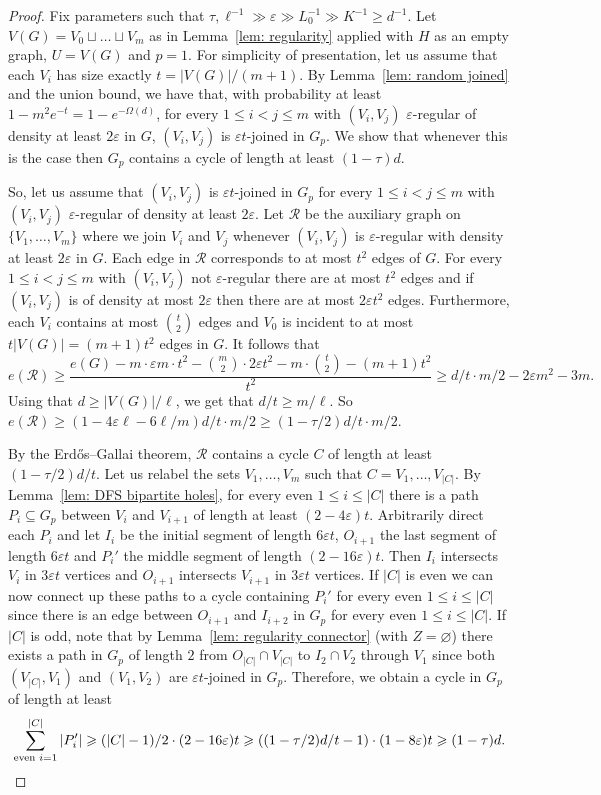 \documentclass[10pt]{article}
\theoremstyle{definition}
\let\leq\leqslant
\let\geq\geqslant
\begin{document}
\begin{proof}
Fix parameters such that $\tau, \ell^{-1}\gg \varepsilon\gg L_0^{-1}\gg K^{-1}\geq d^{-1}$.
Let $V(G)=V_0\sqcup\ldots\sqcup V_{m}$ as in Lemma~\ref{lem: regularity} applied with $H$ as an empty graph, $U=V(G)$ and $p=1$. For simplicity of presentation, let us assume that each $V_i$ has size exactly $t=|V(G)|/(m+1)$. By Lemma~\ref{lem: random joined} and the union bound, we have that, with probability at least $1-m^2e^{-t}=1-e^{-\Omega(d)}$, for every $1\leq i<j\leq m$ with $(V_i,V_j)$ $\varepsilon$-regular of density at least $2\varepsilon$ in $G$, $(V_i,V_j)$ is $\varepsilon t$-joined in $G_p$. We show that whenever this is the case then $G_p$ contains a cycle of length at least $(1-\tau)d$.

So, let us assume that $(V_i,V_j)$ is $\varepsilon t$-joined in $G_p$ for every $1\leq i<j\leq m$ with $(V_i,V_j)$ $\varepsilon$-regular of density at least $2\varepsilon$.
Let $\mathcal R$ be the auxiliary graph on $\{V_1,\ldots,V_m\}$ where we join $V_i$ and $V_j$ whenever $(V_i,V_j)$ is $\varepsilon$-regular with density at least $2\varepsilon$ in $G$. Each edge in $\mathcal R$ corresponds to at most $t^2$ edges of $G$. For every $1\leq i<j\leq m$ with $(V_i,V_j)$ not $\varepsilon$-regular there are at most $t^2$ edges and if $(V_i,V_j)$ is of density at most $2\varepsilon$ then there are at most $2\varepsilon t^2$ edges. Furthermore, each $V_i$ contains at most $\binom{t}{2}$ edges and $V_0$ is incident to at most $t|V(G)|=(m+1)t^2$ edges in $G$. It follows that 
$$
e(\mathcal R)\geq \frac{e(G)-m\cdot\varepsilon m\cdot t^2-\binom{m}{2}\cdot 2\varepsilon t^2-m\cdot \binom{t}{2}-(m+1)t^2}{t^2}\geq d/t\cdot m/2-2\varepsilon m^2-3m. 
$$
Using that $d\geq |V(G)|/\ell$, we get that $d/t\geq m/\ell$. So $e(\mathcal R)\geq (1-4\varepsilon\ell-6\ell/m)d/t\cdot m/2\geq (1-\tau/2)d/t\cdot m/2$.

By the Erd\H{o}s--Gallai theorem, $\mathcal R$ contains a cycle $C$ of length at least $(1-\tau/2)d/t$. Let us relabel the sets $V_1,\ldots,V_m$ such that $C=V_1,\ldots, V_{|C|}$. By Lemma~\ref{lem: DFS bipartite holes}, for every even $1\leq i\leq |C|$ there is a path $P_i\subseteq G_p$ between $V_i$ and $V_{i+1}$ of length at least $(2-4\varepsilon)t$. Arbitrarily direct each $P_i$ and let $I_i$ be the initial segment of length $6\varepsilon t$, $O_{i+1}$ the last segment of length $6\varepsilon t$ and $P_i'$ the middle segment of length $(2-16\varepsilon)t$. Then $I_i$ intersects $V_i$ in $3\varepsilon t$ vertices and $O_{i+1}$ intersects $V_{i+1}$ in $3\varepsilon t$ vertices. If $|C|$ is even we can now connect up these paths to a cycle containing $P_i'$ for every even $1\leq i\leq |C|$ since there is an edge between $O_{i+1}$ and $I_{i+2}$ in $G_p$ for every even $1\leq i\leq |C|$. If $|C|$ is odd, note that by Lemma~\ref{lem: regularity connector} (with $Z=\varnothing$) there exists a path in $G_p$ of length $2$ from $O_{|C|}\cap V_{|C|}$ to $I_2\cap V_2$ through $V_1$ since both $(V_{|C|},V_1)$ and $(V_{1},V_2)$ are $\varepsilon t$-joined in $G_p$. Therefore, we obtain a cycle in $G_p$ of length at least 
\[
\sum_{\text{even }i=1}^{|C|} |P_i'|\geq 
(|C|-1)/2\cdot (2-16\varepsilon)t\geq ((1-\tau/2)d/t-1)\cdot (1-8\varepsilon)t\geq (1-\tau)d.\qedhere
\]
\end{proof}
\end{document}
